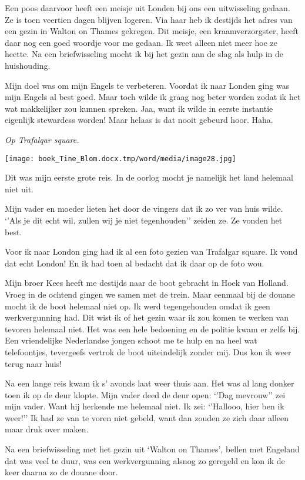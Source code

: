 \documentclass{scrbook}
\begin{document}
{Een poos daarvoor heeft een meisje uit Londen bij ons een uitwisseling gedaan. Ze is toen veertien dagen blijven logeren. Via haar heb ik destijds het adres van een gezin in Walton on Thames gekregen. Dit meisje, een kraamverzorgster, heeft daar nog een goed woordje voor me gedaan. Ik weet alleen niet meer hoe ze heette. Na een briefwisseling mocht ik bij het gezin aan de slag als hulp in de huishouding. 

Mijn doel was om mijn Engels te verbeteren. Voordat ik naar Londen ging was mijn Engels al best goed. Maar toch wilde ik graag nog beter worden zodat ik het wat makkelijker zou kunnen spreken. Jaa, want ik wilde in eerste instantie eigenlijk stewardess worden! Maar helaas is dat nooit gebeurd hoor. Haha. 

\textit{Op Trafalqar square.    }



 \texttt{[image: boek\_Tine\_Blom.docx.tmp/word/media/image28.jpg]}

Dit was mijn eerste grote reis. In de oorlog mocht je namelijk het land helemaal niet uit.

Mijn vader en moeder lieten het door de vingers dat ik zo ver van huis wilde. ‘’Als je dit echt wil, zullen wij je niet tegenhouden’’ zeiden ze. Ze vonden het best. 

Voor ik naar London ging had ik al een foto gezien van Trafalgar square. Ik vond dat echt London! En ik had toen al bedacht dat ik daar op de foto wou.

Mijn broer Kees heeft me destijds naar de boot gebracht in Hoek van Holland. Vroeg in de ochtend gingen we samen met de trein. Maar eenmaal bij de douane mocht ik de boot helemaal niet op. Ik werd tegengehouden omdat ik geen werkvergunning had. Dit wist ik of het gezin waar ik zou komen te werken van tevoren helemaal niet. Het was een hele bedoening en de politie kwam er zelfs bij. Een vriendelijke Nederlandse jongen schoot me te hulp en na heel wat telefoontjes, tevergeefs vertrok de boot uiteindelijk zonder mij. Dus kon ik weer terug naar huis!

Na een lange reis kwam ik s’ avonds laat weer thuis aan. Het was al lang donker toen ik op de deur klopte. Mijn vader deed de deur open: ‘’Dag mevrouw’’ zei mijn vader. Want hij herkende me helemaal niet. Ik zei: ‘’Hallooo, hier ben ik weer!’’ Ik had ze van te voren niet gebeld, want dan zouden ze zich daar alleen maar druk over maken. 

Na een briefwisseling met het gezin uit ‘Walton on Thames’, bellen met Engeland dat was veel te duur, was een werkvergunning alsnog zo geregeld en kon ik de keer daarna zo de douane door. 

}
\end{document}
